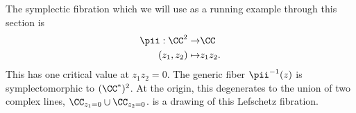 

    The symplectic fibration which we will use as a running example through this section is 
    \begin{align*}
        \pii:\CC^2\to& \CC\\
        (z_1, z_2)\mapsto& z_1z_2.
    \end{align*}
    This has one critical value at $z_1z_2=0$.
    The generic fiber $\pii^{-1}(z)$ is symplectomorphic to $(\CC^*)^2$.
    At the origin, this degenerates to the union of two complex lines, $\CC_{z_1=0}\cup \CC_{z_2=0}$.
     is a drawing of this Lefschetz fibration.

